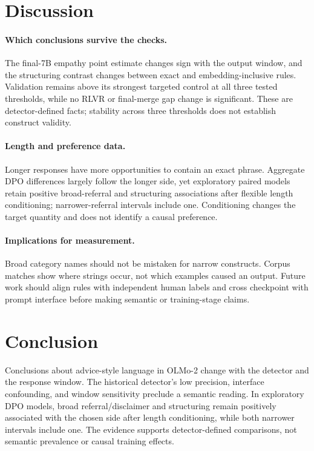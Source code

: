 \documentclass[11pt]{article}
\begin{document}
\section{Discussion}

\paragraph{Which conclusions survive the checks.}
The final-7B empathy point estimate changes sign with the output window, and the
structuring contrast changes between exact and embedding-inclusive rules.
Validation remains above its strongest targeted control at all three tested
thresholds, while no RLVR or final-merge gap change is significant. These are
detector-defined facts; stability across three thresholds does not establish
construct validity.

\paragraph{Length and preference data.}
Longer responses have more opportunities to contain an exact phrase. Aggregate
DPO differences largely follow the longer side, yet exploratory paired models
retain positive broad-referral and structuring associations after flexible
length conditioning; narrower-referral intervals include one. Conditioning
changes the target quantity and does not identify a causal preference.

\paragraph{Implications for measurement.}
Broad category names should not be mistaken for narrow constructs. Corpus
matches show where strings occur, not which examples caused an output. Future
work should align rules with independent human labels and cross checkpoint with
prompt interface before making semantic or training-stage claims.

\section{Conclusion}
\label{sec:roadmap}

Conclusions about advice-style language in OLMo-2 change with the detector and
the response window. The historical detector's low precision, interface
confounding, and window sensitivity preclude a semantic reading. In exploratory
DPO models, broad referral/disclaimer and structuring remain positively
associated with the chosen side after length conditioning, while both narrower
intervals include one. The evidence supports detector-defined comparisons, not
semantic prevalence or causal training effects.
\end{document}

